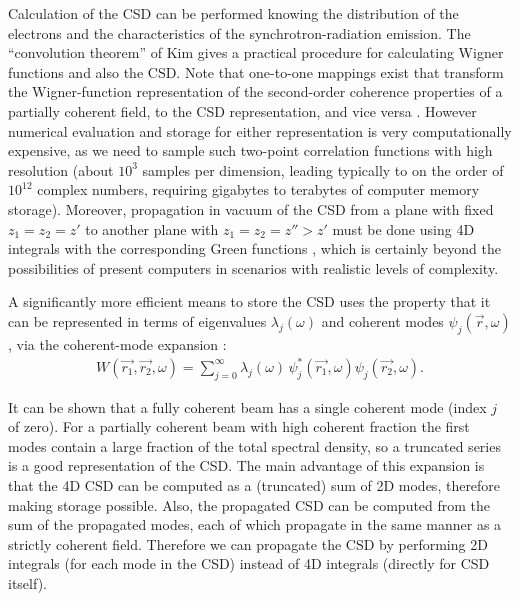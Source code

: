 \documentclass[%
 reprint,
 amsmath,amssymb,
 aps,
]{revtex4-1}
\begin{document}
Calculation of the CSD can be performed knowing the distribution of the electrons and the characteristics of the synchrotron-radiation emission. The ``convolution theorem'' of Kim \cite{kim} gives a practical procedure for calculating Wigner functions \cite{Wigner1932} and also the CSD. Note that one-to-one mappings exist that transform the Wigner-function representation of the second-order coherence properties of a partially coherent field, to the CSD representation, and vice versa \cite{AlonsoWignerFunctionReview}.  However  numerical evaluation and storage for either representation is very computationally expensive, as we need to sample such two-point correlation functions with high resolution (about $10^3$ samples per dimension, leading typically to on the order of $10^{12}$ complex numbers, requiring gigabytes to terabytes of computer memory storage). Moreover, propagation in vacuum of the CSD from a plane with fixed $z_1=z_2= z'$ to another plane with $z_1=z_2=z''>z'$ must be done using 4D integrals with the corresponding Green functions \cite{mandel_wolf}, which is certainly beyond the possibilities of present computers in scenarios with realistic levels of complexity. 

A significantly more efficient means to store the CSD uses the property that it can be represented in terms of eigenvalues $\lambda_j(\omega)$ and coherent modes $\psi_j(\vec{r}, \omega)$, via the coherent-mode expansion
\cite{Wolf1982,mandel_wolf}:
\begin{equation}
\begin{aligned}
W(\vec{r_1}, \vec{r_2}, \omega)
=
\sum_{j=0}^{\infty}
\lambda_j(\omega) \,
\psi_j^*(\vec{r_1},\omega)
\psi_j(\vec{r_2}, \omega).
\end{aligned}\label{eq:CoherentModeExpansion}
\end{equation}

It can be shown that a fully coherent beam has a single coherent mode (index $j$ of zero). For a partially coherent beam with high coherent fraction the first modes contain a large fraction of the total spectral density, so a truncated series is a good representation of the CSD. The main advantage of this expansion is that the 4D CSD can be computed as a (truncated) sum of 2D modes, therefore making storage possible. Also, the propagated CSD can be computed from the sum of the propagated modes, each of which propagate in the same manner as a strictly coherent field.  Therefore we can propagate the CSD by performing 2D integrals (for each mode in the CSD) instead of 4D integrals (directly for CSD itself).  
\end{document}
